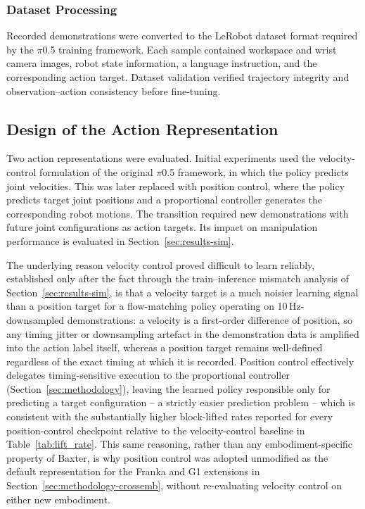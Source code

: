 \documentclass[12pt]{article}
\begin{document}
\subsubsection{Dataset Processing}
Recorded demonstrations were converted to the LeRobot dataset format required by the $\pi$0.5 training framework. Each sample contained workspace and wrist camera images, robot state information, a language instruction, and the corresponding action target. Dataset validation verified trajectory integrity and observation--action consistency before fine-tuning.

\subsection{Design of the Action Representation}
\label{sec:action-rep}

Two action representations were evaluated. Initial experiments used the velocity-control formulation of the original $\pi$0.5 framework, in which the policy predicts joint velocities. This was later replaced with position control, where the policy predicts target joint positions and a proportional controller generates the corresponding robot motions. The transition required new demonstrations with future joint configurations as action targets. Its impact on manipulation performance is evaluated in Section~\ref{sec:results-sim}.

The underlying reason velocity control proved difficult to learn reliably, established only after the fact through the train--inference mismatch analysis of Section~\ref{sec:results-sim}, is that a velocity target is a much noisier learning signal than a position target for a flow-matching policy operating on 10\,Hz-downsampled demonstrations: a velocity is a first-order difference of position, so any timing jitter or downsampling artefact in the demonstration data is amplified into the action label itself, whereas a position target remains well-defined regardless of the exact timing at which it is recorded. Position control effectively delegates timing-sensitive execution to the proportional controller (Section~\ref{sec:methodology}), leaving the learned policy responsible only for predicting a target configuration -- a strictly easier prediction problem -- which is consistent with the substantially higher block-lifted rates reported for every position-control checkpoint relative to the velocity-control baseline in Table~\ref{tab:lift_rate}. This same reasoning, rather than any embodiment-specific property of Baxter, is why position control was adopted unmodified as the default representation for the Franka and G1 extensions in Section~\ref{sec:methodology-crossemb}, without re-evaluating velocity control on either new embodiment.
\end{document}
